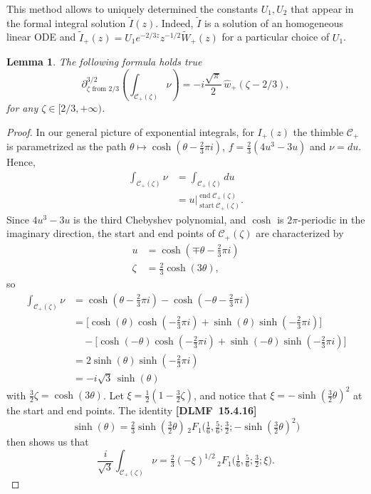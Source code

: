 \documentclass{article}
\newtheorem{lemma}[definition]{Lemma}
\begin{document}
This method allows to uniquely determined the constants $U_1,U_2$ that appear in the formal integral solution $\tilde{I}(z)$. Indeed, $\tilde{I}$ is a solution of an homogeneous linear ODE and $\tilde{I}_+(z)=U_1e^{-2/3z}z^{-1/2}\tilde{W}_+(z)$ for a particular choice of $U_1$. %
\begin{lemma}\label{claim 2}
The following formula holds true
\[ \partial^{3/2}_{\zeta \text{ from } 2/3} \left( \int_{\mathcal{C}_+(\zeta)} \nu \right) = -i \frac{\sqrt{\pi}}{2}\,\hat{w}_+(\zeta-2/3), \]
for any $\zeta\in [2/3,+\infty)$.
\end{lemma}
\begin{proof}
In our general picture of exponential integrals, for $I_+(z)$ the thimble $\mathcal{C}_+$ is parametrized as the path $\theta \mapsto \cosh(\theta - \tfrac{2}{3}\pi i)$, $f = \tfrac{2}{3}(4u^3 - 3u)$ and $\nu = du$. Hence,
\begin{align*}
\int_{\mathcal{C}_+(\zeta)} \nu & = \int_{\mathcal{C}_+(\zeta)} du \\
& = u \Big|_{\operatorname{start} \mathcal{C}_+(\zeta)}^{\operatorname{end} \mathcal{C}_+(\zeta)}.
\end{align*}
Since $4u^3 - 3u$ is the third Chebyshev polynomial, and $\cosh$ is $2\pi$-periodic in the imaginary direction, the start and end points of $\mathcal{C}_+(\zeta)$ are characterized by
\begin{align*}
u & = \cosh(\mp\theta - \tfrac{2}{3}\pi i) \\
\zeta & = \tfrac{2}{3} \cosh(3\theta),
\end{align*}
so
\begin{align*}
\int_{\mathcal{C}_+(\zeta)} \nu & = \cosh(\theta - \tfrac{2}{3}\pi i) - \cosh(-\theta - \tfrac{2}{3}\pi i) \\
& = \big[\cosh(\theta) \cosh(-\tfrac{2}{3}\pi i) + \sinh(\theta) \sinh(-\tfrac{2}{3}\pi i)\big] \\
& \quad - \big[\cosh(-\theta) \cosh(-\tfrac{2}{3}\pi i) + \sinh(-\theta) \sinh(-\tfrac{2}{3}\pi i)\big] \\
& = 2\sinh(\theta) \sinh(-\tfrac{2}{3}\pi i) \\
& = -i\sqrt{3}\,\sinh(\theta)
\end{align*}
with $\tfrac{3}{2} \zeta = \cosh(3\theta)$. Let $\xi = \tfrac{1}{2}(1 - \tfrac{3}{2}\zeta)$, and notice that $\xi = -\sinh(\tfrac{3}{2} \theta)^2$ at the start and end points. The identity \textbf{[DLMF~15.4.16]}
\[ \sinh(\theta) = \tfrac{2}{3} \sinh(\tfrac{3}{2} \theta)\,{}_2F_1\big(\tfrac{1}{6}, \tfrac{5}{6}; \tfrac{3}{2}; -\sinh(\tfrac{3}{2} \theta)^2\big) \]
then shows us that
\[ \frac{i}{\sqrt{3}} \int_{\mathcal{C}_+(\zeta)} \nu = \tfrac{2}{3} (-\xi)^{1/2}\,{}_2F_1\big(\tfrac{1}{6}, \tfrac{5}{6}; \tfrac{3}{2}; \xi\big). \]


\end{proof}
\end{document}
